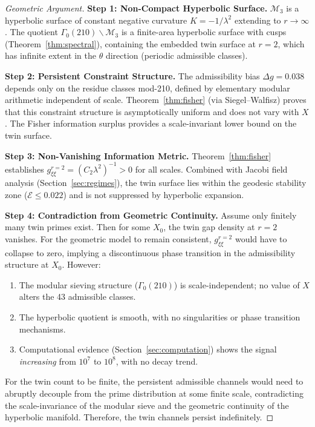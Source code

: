 \documentclass[12pt]{article}
\begin{document}
\begin{proof}[Geometric Argument]
\textbf{Step 1: Non-Compact Hyperbolic Surface.}
$\mathcal{M}_3$ is a hyperbolic surface of constant negative curvature
$K = -1/\lambda^2$ extending to $r \to \infty$. The quotient
$\Gamma_0(210) \backslash \mathcal{M}_3$ is a finite-area hyperbolic surface
with cusps (Theorem~\ref{thm:spectral}), containing the embedded twin surface
at $r=2$, which has infinite extent in the $\theta$ direction (periodic
admissible classes).

\textbf{Step 2: Persistent Constraint Structure.}
The admissibility bias $\Delta g = 0.038$ depends only on the residue classes
mod-210, defined by elementary modular arithmetic independent of scale.
Theorem~\ref{thm:fisher} (via Siegel--Walfisz) proves that this constraint
structure is asymptotically uniform and does not vary with $X$. The Fisher
information surplus provides a scale-invariant lower bound on the twin surface.

\textbf{Step 3: Non-Vanishing Information Metric.}
Theorem~\ref{thm:fisher} establishes $g_{\xi\xi}^{r=2} = (C_2\lambda^2)^{-1} > 0$
for all scales. Combined with Jacobi field analysis (Section~\ref{sec:regimes}),
the twin surface lies within the geodesic stability zone
($\mathcal{E} \leq 0.022$) and is not suppressed by hyperbolic expansion.

\textbf{Step 4: Contradiction from Geometric Continuity.}
Assume only finitely many twin primes exist. Then for some $X_0$, the twin
gap density at $r=2$ vanishes. For the geometric model to remain consistent,
$g_{\xi\xi}^{r=2}$ would have to collapse to zero, implying a discontinuous
phase transition in the admissibility structure at $X_0$. However:
\begin{enumerate}
  \item The modular sieving structure ($\Gamma_0(210)$) is scale-independent;
    no value of $X$ alters the 43 admissible classes.
  \item The hyperbolic quotient is smooth, with no singularities or phase
    transition mechanisms.
  \item Computational evidence (Section~\ref{sec:computation}) shows the signal
    \textit{increasing} from $10^7$ to $10^8$, with no decay trend.
\end{enumerate}
For the twin count to be finite, the persistent admissible channels would need
to abruptly decouple from the prime distribution at some finite scale,
contradicting the scale-invariance of the modular sieve and the geometric
continuity of the hyperbolic manifold. Therefore, the twin channels persist
indefinitely.
\end{proof}
\end{document}
